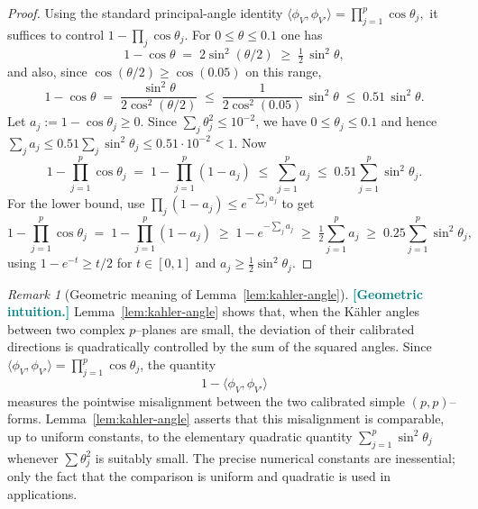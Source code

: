 \documentclass[11pt]{article}
\newcommand{\REVMZ}[1]{\textcolor{teal}{#1}}  %
\numberwithin{equation}{section}  %
\theoremstyle{plain}
\theoremstyle{definition}
\theoremstyle{remark}
\newtheorem{remark}[theorem]{Remark}
\begin{document}
\begin{proof}
	Using the standard principal-angle identity \REVMZ{\cite{GH78}}
	\(
	\langle \phi_{V},\phi_{V'}\rangle=\prod_{j=1}^{p}\cos\theta_{j},
	\)
	it suffices to control $1-\prod_j\cos\theta_j$.
	For $0\le\theta\le 0.1$ one has
	\[
	1-\cos\theta \;=\; 2\sin^2(\theta/2)
	\;\ge\; \tfrac12\,\sin^2\theta,
	\]
	and also, since $\cos(\theta/2)\ge \cos(0.05)$ on this range,
	\[
	1-\cos\theta \;=\; \frac{\sin^2\theta}{2\cos^2(\theta/2)}
	\;\le\; \frac{1}{2\cos^2(0.05)}\,\sin^2\theta
	\;\le\; 0.51\,\sin^2\theta.
	\]
	Let $a_j:=1-\cos\theta_j\ge 0$.  Since $\sum_j\theta_j^2\le 10^{-2}$, we have $0\le \theta_j\le 0.1$ and hence
	$\sum_j a_j \le 0.51\sum_j\sin^2\theta_j\le 0.51\cdot 10^{-2}<1$.
	Now
	\[
	1-\prod_{j=1}^p\cos\theta_j
	\;=\;1-\prod_{j=1}^p(1-a_j)
	\;\le\;\sum_{j=1}^p a_j
	\;\le\;0.51\sum_{j=1}^p\sin^2\theta_j.
	\]
	For the lower bound, use $\prod_j(1-a_j)\le e^{-\sum_j a_j}$ to get
	\[
	1-\prod_{j=1}^p\cos\theta_j
	\;=\;1-\prod_{j=1}^p(1-a_j)
	\;\ge\;1-e^{-\sum_j a_j}
	\;\ge\;\tfrac12\sum_{j=1}^p a_j
	\;\ge\;0.25\sum_{j=1}^p \sin^2\theta_j,
	\]
	using $1-e^{-t}\ge t/2$ for $t\in[0,1]$ and $a_j\ge \tfrac12\sin^2\theta_j$.
\end{proof}


\begin{remark}[Geometric meaning of Lemma~\ref{lem:kahler-angle}]
\REVMZ{\textbf{[Geometric intuition.]}}
	Lemma~\ref{lem:kahler-angle} shows that, when the K\"ahler angles between two
	complex $p$--planes are small, the deviation of their calibrated directions is
	quadratically controlled by the sum of the squared angles.  Since
	$\langle\phi_{V},\phi_{V'}\rangle = \prod_{j=1}^{p}\cos\theta_{j}$, the
	quantity
	\[
	1 - \langle \phi_{V},\phi_{V'}\rangle
	\]
	measures the pointwise misalignment between the two calibrated simple
	$(p,p)$--forms.  Lemma~\ref{lem:kahler-angle} asserts that this misalignment is
	comparable, up to uniform constants, to the elementary quadratic quantity
	$\sum_{j=1}^{p}\sin^{2}\theta_{j}$ whenever $\sum \theta_{j}^{2}$ is suitably
	small.  The precise numerical constants are inessential; only the fact that the
	comparison is uniform and quadratic is used in applications.
\end{remark}


\end{document}
